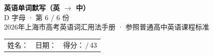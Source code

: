 \documentclass[10pt,a4paper]{article}
\begin{document}
\pagestyle{plain}

\begin{center}
{\LARGE\bfseries 英语单词默写（英 $\to$ 中）}\\[0.22em]
{\large D 字母 · 第 6 / 6 份}\\[0.18em]
{\small 2026年上海市高考英语词汇用法手册 · 参照普通高中英语课程标准}
\end{center}

\vspace{0.25em}
\noindent\begin{tabular}{@{}p{}@{}p{}@{}p{}@{}}
姓名：\underline{\hspace{2.0cm}} & 日期：\underline{\hspace{2.0cm}} & 得分：\underline{\hspace{1.3cm}}\,/\,43 \\
\end{tabular}

\vspace{0.3em}

\vspace{0.08em}
\end{document}
